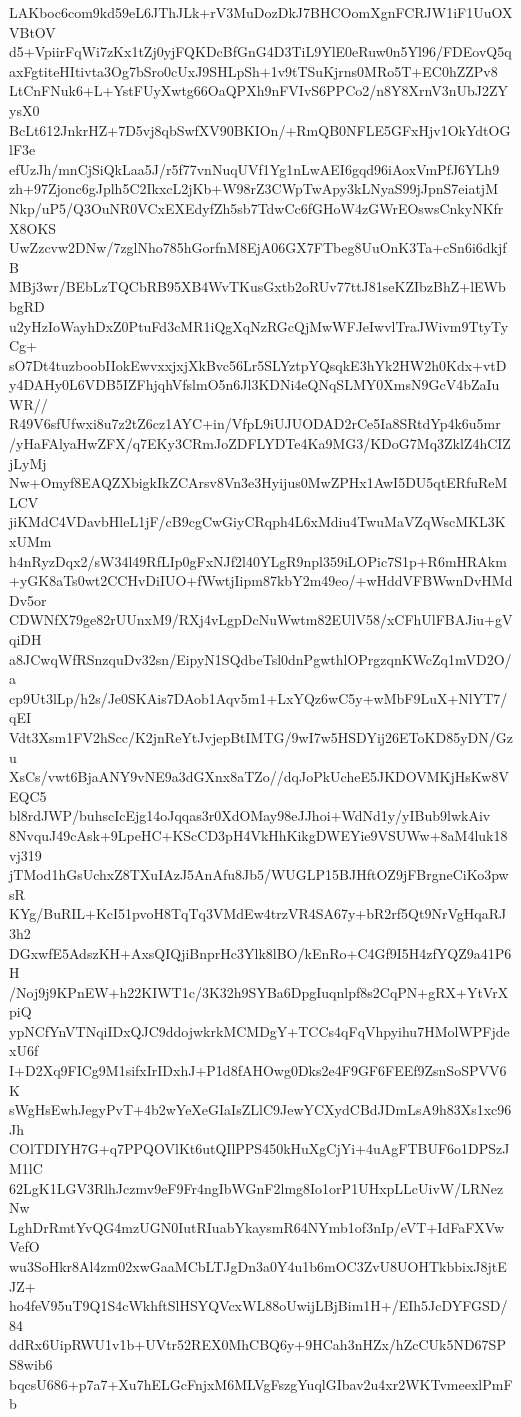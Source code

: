 LAKboc6com9kd59eL6JThJLk+rV3MuDozDkJ7BHCOomXgnFCRJW1iF1UuOXVBtOV
d5+VpiirFqWi7zKx1tZj0yjFQKDcBfGnG4D3TiL9YlE0eRuw0n5Yl96/FDEovQ5q
axFgtiteHItivta3Og7bSro0cUxJ9SHLpSh+1v9tTSuKjrns0MRo5T+EC0hZZPv8
LtCnFNuk6+L+YstFUyXwtg66OaQPXh9nFVIvS6PPCo2/n8Y8XrnV3nUbJ2ZYysX0
BcLt612JnkrHZ+7D5vj8qbSwfXV90BKIOn/+RmQB0NFLE5GFxHjv1OkYdtOGlF3e
efUzJh/mnCjSiQkLaa5J/r5f77vnNuqUVf1Yg1nLwAEI6gqd96iAoxVmPfJ6YLh9
zh+97Zjonc6gJplh5C2IkxcL2jKb+W98rZ3CWpTwApy3kLNyaS99jJpnS7eiatjM
Nkp/uP5/Q3OuNR0VCxEXEdyfZh5sb7TdwCc6fGHoW4zGWrEOswsCnkyNKfrX8OKS
UwZzcvw2DNw/7zglNho785hGorfnM8EjA06GX7FTbeg8UuOnK3Ta+cSn6i6dkjfB
MBj3wr/BEbLzTQCbRB95XB4WvTKusGxtb2oRUv77ttJ81seKZIbzBhZ+lEWbbgRD
u2yHzIoWayhDxZ0PtuFd3cMR1iQgXqNzRGcQjMwWFJeIwvlTraJWivm9TtyTyCg+
sO7Dt4tuzboobIIokEwvxxjxjXkBvc56Lr5SLYztpYQsqkE3hYk2HW2h0Kdx+vtD
y4DAHy0L6VDB5IZFhjqhVfslmO5n6Jl3KDNi4eQNqSLMY0XmsN9GcV4bZaIuWR//
R49V6sfUfwxi8u7z2tZ6cz1AYC+in/VfpL9iUJUODAD2rCe5Ia8SRtdYp4k6u5mr
/yHaFAlyaHwZFX/q7EKy3CRmJoZDFLYDTe4Ka9MG3/KDoG7Mq3ZklZ4hCIZjLyMj
Nw+Omyf8EAQZXbigkIkZCArsv8Vn3e3Hyijus0MwZPHx1AwI5DU5qtERfuReMLCV
jiKMdC4VDavbHleL1jF/cB9cgCwGiyCRqph4L6xMdiu4TwuMaVZqWscMKL3KxUMm
h4nRyzDqx2/sW34l49RfLIp0gFxNJf2l40YLgR9npl359iLOPic7S1p+R6mHRAkm
+yGK8aTs0wt2CCHvDiIUO+fWwtjIipm87kbY2m49eo/+wHddVFBWwnDvHMdDv5or
CDWNfX79ge82rUUnxM9/RXj4vLgpDcNuWwtm82EUlV58/xCFhUlFBAJiu+gVqiDH
a8JCwqWfRSnzquDv32sn/EipyN1SQdbeTsl0dnPgwthlOPrgzqnKWcZq1mVD2O/a
cp9Ut3lLp/h2s/Je0SKAis7DAob1Aqv5m1+LxYQz6wC5y+wMbF9LuX+NlYT7/qEI
Vdt3Xsm1FV2hScc/K2jnReYtJvjepBtIMTG/9wI7w5HSDYij26EToKD85yDN/Gzu
XsCs/vwt6BjaANY9vNE9a3dGXnx8aTZo//dqJoPkUcheE5JKDOVMKjHsKw8VEQC5
bl8rdJWP/buhscIcEjg14oJqqas3r0XdOMay98eJJhoi+WdNd1y/yIBub9lwkAiv
8NvquJ49cAsk+9LpeHC+KScCD3pH4VkHhKikgDWEYie9VSUWw+8aM4luk18vj319
jTMod1hGsUchxZ8TXuIAzJ5AnAfu8Jb5/WUGLP15BJHftOZ9jFBrgneCiKo3pwsR
KYg/BuRIL+KcI51pvoH8TqTq3VMdEw4trzVR4SA67y+bR2rf5Qt9NrVgHqaRJ3h2
DGxwfE5AdszKH+AxsQIQjiBnprHc3Ylk8lBO/kEnRo+C4Gf9I5H4zfYQZ9a41P6H
/Noj9j9KPnEW+h22KIWT1c/3K32h9SYBa6DpgIuqnlpf8s2CqPN+gRX+YtVrXpiQ
ypNCfYnVTNqiIDxQJC9ddojwkrkMCMDgY+TCCs4qFqVhpyihu7HMolWPFjdexU6f
I+D2Xq9FICg9M1sifxIrIDxhJ+P1d8fAHOwg0Dks2e4F9GF6FEEf9ZsnSoSPVV6K
sWgHsEwhJegyPvT+4b2wYeXeGIaIsZLlC9JewYCXydCBdJDmLsA9h83Xs1xc96Jh
COlTDIYH7G+q7PPQOVlKt6utQIlPPS450kHuXgCjYi+4uAgFTBUF6o1DPSzJM1lC
62LgK1LGV3RlhJczmv9eF9Fr4ngIbWGnF2lmg8Io1orP1UHxpLLcUivW/LRNezNw
LghDrRmtYvQG4mzUGN0IutRIuabYkaysmR64NYmb1of3nIp/eVT+IdFaFXVwVefO
wu3SoHkr8Al4zm02xwGaaMCbLTJgDn3a0Y4u1b6mOC3ZvU8UOHTkbbixJ8jtEJZ+
ho4feV95uT9Q1S4cWkhftSlHSYQVcxWL88oUwijLBjBim1H+/EIh5JcDYFGSD/84
ddRx6UipRWU1v1b+UVtr52REX0MhCBQ6y+9HCah3nHZx/hZcCUk5ND67SPS8wib6
bqcsU686+p7a7+Xu7hELGcFnjxM6MLVgFszgYuqlGIbav2u4xr2WKTvmeexlPmFb
